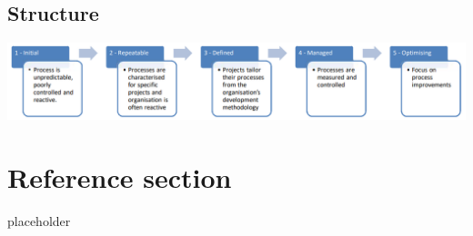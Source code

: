 \documentclass{article}
\begin{document}
\subsection{Structure}

\begin{center}
  \includegraphics[scale=0.5]{cmm_structur.png}
\end{center}

\pagebreak
\section*{Reference section} \label{sec:reference}
\begin{description}
	\item[placeholder] \hfill \\
\end{description}
\end{document}
